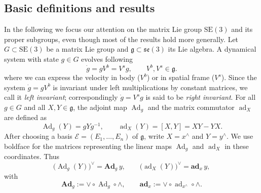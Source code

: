 \documentclass[10pt,twocolumn]{article}
\newenvironment{revision}{\color{red}}{}
\newcommand{\bAd}{\mathbf{Ad}}
\newcommand{\bad}{\mathbf{ad}}
\newcommand{\SE}{\mathrm{SE}}
\newcommand{\se}{\mathfrak{se}}
\newcommand{\gfrak}{\mathfrak g}
\newcommand{\Ad}{\operatorname{Ad}}
\newcommand{\ad}{\operatorname{ad}}
\begin{document}
\subsection{Basic definitions and results}\label{subsec:basic-definitions}
In the following we focus our attention on the matrix Lie group $\SE(3)$ and its proper subgroups, even though most of the results hold more generally. Let $G\subset\SE(3)$ be a matrix Lie group and $\gfrak\subset\se(3)$ its Lie algebra. A dynamical system with state $g\in G$ evolves following
\begin{equation*}
\dot g=gV^b=V^s g,\qquad V^b,V^s\in\gfrak.\tag{1}\label{eq:1}
\end{equation*}
where we can express the velocity in body ($V^b$) or in spatial frame ($V^s$). Since the system $\dot g=gV^b$ is invariant under left multiplications by constant matrices, we call it \emph{left invariant}; correspondingly $\dot g=V^s g$ is said to be \emph{right invariant}. For all $g\in G$ and all $X,Y\in\gfrak$, the adjoint map $\Ad_g$ and the matrix commutator $\ad_X$ are defined as
\begin{equation*}
\Ad_g(Y)=gYg^{-1},
\qquad
\ad_X(Y)=[X,Y]=XY-YX.
\end{equation*}
\begin{revision}
After choosing a basis $\mathcal E=(E_1,\ldots,E_n)$ of $\gfrak$, write $X=x^\wedge$ and $Y=y^\wedge$. We use boldface for the matrices representing the linear maps $\Ad_g$ and $\ad_X$ in these coordinates. Thus
\[
\bigl(\Ad_g(Y)\bigr)^\vee=\bAd_g\,y,
\qquad
\bigl(\ad_X(Y)\bigr)^\vee=\bad_x\,y,
\]
with
\[
\boxed{
\bAd_g:=\vee\circ\Ad_g\circ\wedge,
\qquad
\bad_x:=\vee\circ\ad_{x^\wedge}\circ\wedge.
}
\]
\end{revision}
\end{document}

